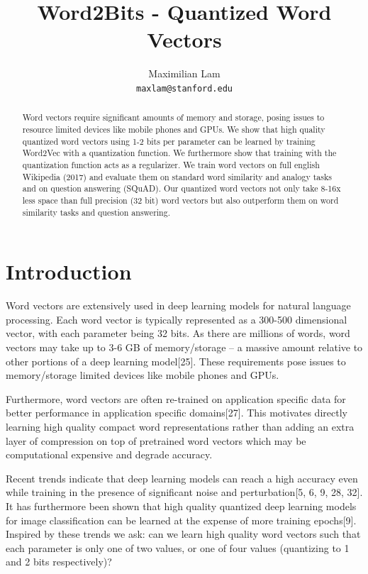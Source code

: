 \documentclass{article} %
\title{Word2Bits - Quantized Word Vectors}
\author{
Maximilian Lam\\
\texttt{maxlam@stanford.edu} \\
}
\begin{document}
\maketitle

\begin{abstract}
Word vectors require significant amounts of memory and storage, posing
issues to resource limited devices like mobile phones and GPUs. We
show that high quality quantized word vectors using 1-2 bits per
parameter can be learned by training Word2Vec with a quantization
function. We furthermore show that training with the quantization
function acts as a regularizer. We train word vectors on full english
Wikipedia (2017) and evaluate them on standard word similarity and
analogy tasks and on question answering (SQuAD). Our quantized word
vectors not only take 8-16x less space than full precision (32 bit)
word vectors but also outperform them on word similarity tasks and
question answering.
\end{abstract}

\section{Introduction}
Word vectors are extensively used in deep learning models for natural
language processing. Each word vector is typically represented as a
300-500 dimensional vector, with each parameter being 32 bits. As
there are millions of words, word vectors may take up to 3-6 GB of
memory/storage -- a massive amount relative to other portions of a
deep learning model[25]. These requirements pose issues to
memory/storage limited devices like mobile phones and GPUs.

Furthermore, word vectors are often re-trained on application specific
data for better performance in application specific domains[27]. This
motivates directly learning high quality compact word representations
rather than adding an extra layer of compression on top of pretrained
word vectors which may be computational expensive and degrade
accuracy.

Recent trends indicate that deep learning models can reach a high
accuracy even while training in the presence of significant noise and
perturbation[5, 6, 9, 28, 32]. It has furthermore been shown that high quality
quantized deep learning models for image classification can be learned
at the expense of more training epochs[9]. Inspired by these trends we
ask: can we learn high quality word vectors such that each parameter
is only one of two values, or one of four values (quantizing to 1 and
2 bits respectively)?
\end{document}
